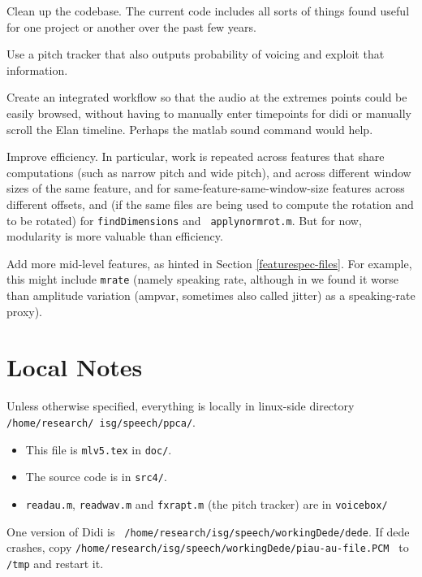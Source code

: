 \documentclass[11pt]{article}
\begin{document}
Clean up the codebase.  The current code includes
all sorts of things found useful for one project or another over the past
few years.

Use a pitch tracker that also outputs probability
of voicing and exploit that information.

Create an integrated workflow so that the audio at the extremes points
could be easily browsed, without having to manually enter timepoints
for didi or manually scroll the Elan timeline.  Perhaps the matlab
sound command would help.

Improve efficiency.  In particular,
work is repeated across features that share computations (such as
narrow pitch and wide pitch), and across different window sizes of the
same feature, and for same-feature-same-window-size features across
different offsets, and (if the same files are being used to compute
the rotation and to be rotated) for {\tt findDimensions} and {\tt
  applynormrot.m}.  But for now, modularity is more valuable than
efficiency.

Add more mid-level features, as hinted in Section
\ref{featurespec-files}.  For example, this might include {\tt mrate}
(namely speaking rate, although in \cite{timelm} we found it worse
than amplitude variation (ampvar, sometimes also called jitter) as a
speaking-rate proxy).

%


\section{Local Notes}

Unless otherwise specified, everything is
  locally in linux-side directory {\tt
    /home/research/ isg/speech/ppca/}.

\begin{itemize} \setlength{\itemsep}{0pt} \setlength{\parskip}{0pt}
\item   This file is {\tt mlv5.tex} in {\tt doc/}.
\item  The source code is in {\tt src4/}.
\item {\tt readau.m}, {\tt readwav.m} and {\tt fxrapt.m} (the pitch
  tracker) are in {\tt voicebox/}
\end{itemize}

One version of Didi is {\tt
  /home/research/isg/speech/workingDede/dede}.  If dede crashes, copy
{\tt /home/research/isg/speech/workingDede/piau-au-file.PCM } to {\tt
  /tmp} and restart it.
\end{document}
